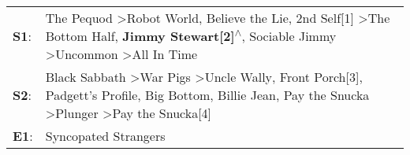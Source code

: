 \begin{supertabular}{p{0.03\textwidth}p{0.92\textwidth}}
 \textbf{S1}:  &                         The Pequod\textsuperscript{} \textgreater \enspace Robot World\textsuperscript{}, \enspace Believe the Lie\textsuperscript{}, \enspace 2nd Self[1]\textsuperscript{} \textgreater \enspace The Bottom Half\textsuperscript{}, \enspace \textbf{Jimmy Stewart[2]\textsuperscript{$\wedge$}}, \enspace Sociable Jimmy\textsuperscript{} \textgreater \enspace Uncommon\textsuperscript{} \textgreater \enspace All In Time\textsuperscript{}  \enspace  \\
 \textbf{S2}:  &  Black Sabbath\textsuperscript{} \textgreater \enspace War Pigs\textsuperscript{} \textgreater \enspace Uncle Wally\textsuperscript{}, \enspace Front Porch[3]\textsuperscript{}, \enspace Padgett's Profile\textsuperscript{}, \enspace Big Bottom\textsuperscript{}, \enspace Billie Jean\textsuperscript{}, \enspace Pay the Snucka\textsuperscript{} \textgreater \enspace Plunger\textsuperscript{} \textgreater \enspace Pay the Snucka[4]\textsuperscript{}  \enspace  \\
 \textbf{E1}:  &                                                                                                                                                                                                                                                                                                                                                                                                                             Syncopated Strangers\textsuperscript{}  \enspace  \\
\end{supertabular}
